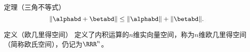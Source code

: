 \begin{frame}
  \begin{footnotesize}
    \begin{block}{定理（三角不等式）}
      $$
      \|\alphabd+\betabd\|\le\|\alphabd\|+\|\betabd\|.
      $$
    \end{block}
  \end{footnotesize}
\end{frame}


\begin{frame}
  \begin{footnotesize}
    \begin{block}{定义（欧几里得空间）}
      定义了内积运算的$n$维实向量空间，称为$n$维欧几里得空间（简称欧氏空间），仍记为$\RRR^n$。
    \end{block}
  \end{footnotesize}
\end{frame}

\begin{frame}
  \begin{footnotesize}
    
  \end{footnotesize}
\end{frame}


\begin{frame}
  \begin{footnotesize}
    
  \end{footnotesize}
\end{frame}


\begin{frame}
  \begin{footnotesize}
    
  \end{footnotesize}
\end{frame}


\begin{frame}
  \begin{footnotesize}
    
  \end{footnotesize}
\end{frame}

